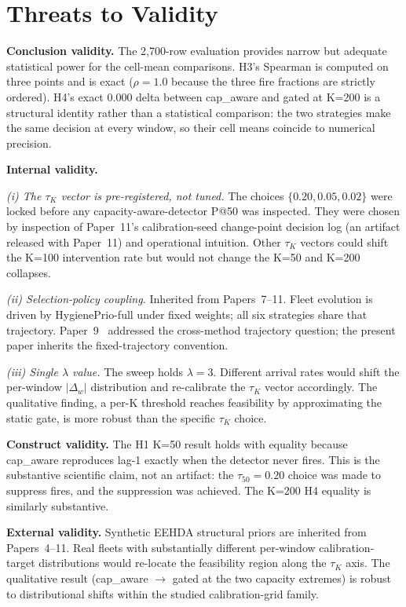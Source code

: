 \section{Threats to Validity}
\label{sec:threats}

\textbf{Conclusion validity.} The 2{,}700-row evaluation provides
narrow but adequate statistical power for the cell-mean comparisons.
H3's Spearman is computed on three points and is exact ($\rho = 1.0$
because the three fire fractions are strictly ordered). H4's exact
$0.000$ delta between cap\_aware and gated at K=200 is a structural
identity rather than a statistical comparison: the two strategies
make the same decision at every window, so their cell means coincide
to numerical precision.

\textbf{Internal validity.}

\textit{(i) The $\tau_K$ vector is pre-registered, not tuned.} The
choices $\{0.20, 0.05, 0.02\}$ were locked before any
capacity-aware-detector P@50 was inspected. They were chosen by
inspection of Paper~11's calibration-seed change-point decision log
(an artifact released with Paper~11) and operational intuition.
Other $\tau_K$ vectors could shift the K=100 intervention rate but
would not change the K=50 and K=200 collapses.

\textit{(ii) Selection-policy coupling.} Inherited from Papers~7--11.
Fleet evolution is driven by HygienePrio-full under fixed weights;
all six strategies share that trajectory. Paper~9~\cite{paper9selftraj}
addressed the cross-method trajectory question; the present paper
inherits the fixed-trajectory convention.

\textit{(iii) Single $\lambda$ value.} The sweep holds $\lambda = 3$.
Different arrival rates would shift the per-window $|\Delta_w|$
distribution and re-calibrate the $\tau_K$ vector accordingly. The
qualitative finding, a per-K threshold reaches feasibility by
approximating the static gate, is more robust than the specific
$\tau_K$ choice.

\textbf{Construct validity.} The H1 K=50 result holds with equality
because cap\_aware reproduces lag-1 exactly when the detector never
fires. This is the substantive scientific claim, not an artifact: the
$\tau_{50} = 0.20$ choice was made to suppress fires, and the
suppression was achieved. The K=200 H4 equality is similarly substantive.

\textbf{External validity.} Synthetic EEHDA structural priors are
inherited from Papers~4--11. Real fleets with substantially different
per-window calibration-target distributions would re-locate the
feasibility region along the $\tau_K$ axis. The qualitative result
(cap\_aware $\to$ gated at the two capacity extremes) is robust to
distributional shifts within the studied calibration-grid family.
